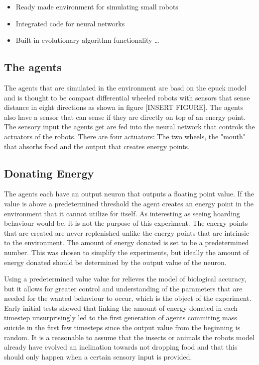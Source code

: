 \documentclass[a4paper]{book}
\begin{document}
\begin{itemize}
  \item Ready made environment for simulating small robots
  \item	Integrated code for neural networks
  \item Built-in evolutionary algorithm functionality  \ldots
\end{itemize}


\subsection{The agents}
The agents that are simulated in the environment are basd on the epuck model and is thought to be compact differential wheeled robots with sensors that sense distance in eight directions as shown in figure [INSERT FIGURE]. The agents also have a sensor that can sense if they are directly on top of an energy point. The sensory input the agents get are fed into the neural network that controls the actuators of the robots. There are four actuators: The two wheels, the "mouth" that absorbs food and the output that creates energy points. 


\subsection{Donating Energy}
The agents each have an output neuron that outputs a floating point value. If the value is above a predetermined threshold the agent creates an energy point in the environment that 
it cannot utilize for itself. As interesting as seeing hoarding behaviour would be, it is not the purpose of this experiment. The energy points that are created are never replenished unlike the energy points that are intrinsic to the environment. The amount of energy donated is set to be a predetermined number. This was chosen to simplify the experiments, but ideally the amount of energy donated should be determined by the output value of the neuron.

Using a predetermined value value for relieves the model of biological accuracy, but it allows for greater control and understanding of the parameters 
that are needed for the wanted behaviour to occur, which is the object of the experiment. Early initial tests showed that linking the amount of energy donated in each timestep unsurprisingly 
led to the first generation of agents commiting mass suicide in the first few timesteps since the output value from the beginning is random. It is a reasonable to assume that the insects or
animals the robots model already have evolved an inclination towards not dropping food and that this should only happen when a certain sensory input is provided.   
\end{document}
